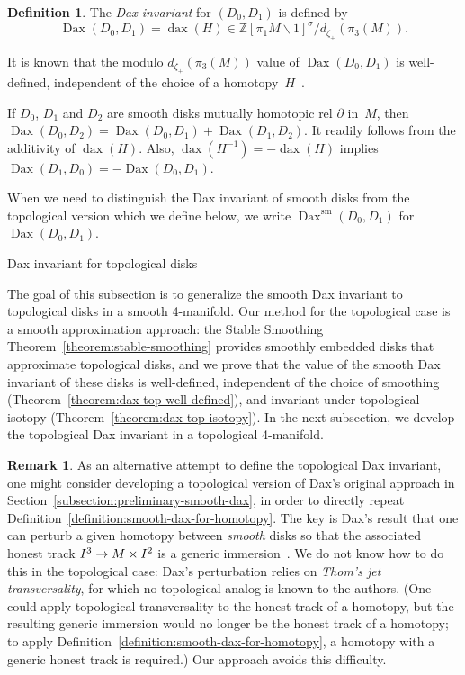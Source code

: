 \documentclass[11pt]{amsart}
\makeatletter
\def\subsection{\@startsection{subsection}{2}%
  \z@{-.8\linespacing\@plus-.3\linespacing}{.5\linespacing\@plus.2\linespacing}%
  {\normalfont\bfseries\large}}
\def\to{\mathchoice{\longrightarrow}{\rightarrow}{\rightarrow}{\rightarrow}}
\theoremstyle{definition}
\newtheorem{definition}[theorem]{Definition}
\newtheorem{remark}[theorem]{Remark}
\theoremstyle{theorem-giventitle}
\theoremstyle{definition-giventitle}
\numberwithin{equation}{section}
\def\Z{\mathbb{Z}}
\def\sm{\mathrm{sm}}
\def\dax{\operatorname{dax}}
\def\Dax{\operatorname{Dax}}
\def\setminus{\smallsetminus}
\makeatother
\begin{document}
\begin{definition}
  \label{definition:smooth-dax-disks}
  The \emph{Dax invariant} for $(D_0,D_1)$ is defined by
  \[
    \Dax(D_0,D_1) = \dax(H) \in \Z[\pi_1 M \setminus 1]^\sigma / d_{\zeta_+}(\pi_3(M)).
  \]
\end{definition}

It is known that the modulo $d_{\zeta_+}(\pi_3(M))$ value of $\Dax(D_0,D_1)$ is well-defined, independent of the choice of a homotopy~$H$~\cite{Gabai:2021-1,Kosanovic-Teichner:2024-2}.

If $D_0$, $D_1$ and $D_2$ are smooth disks mutually homotopic rel $\partial$ in~$M$,
then $\Dax(D_0,D_2) = \Dax(D_0,D_1) + \Dax(D_1,D_2)$.
It readily follows from the additivity of $\dax(H)$.
Also, $\dax(H^{-1}) = -\dax(H)$ implies $\Dax(D_1,D_0) = -\Dax(D_0,D_1)$.

When we need to distinguish the Dax invariant of smooth disks from the topological version which we define below, we write $\Dax^\sm(D_0,D_1)$ for $\Dax(D_0,D_1)$.


\subsection{Dax invariant for topological disks}
\label{subsection:dax-for-top-disks}

The goal of this subsection is to generalize the smooth Dax invariant to topological disks in a smooth 4-manifold.
Our method for the topological case is a smooth approximation approach:
the Stable Smoothing Theorem~\ref{theorem:stable-smoothing} provides smoothly embedded disks that approximate topological disks, and we prove that the value of the smooth Dax invariant of these disks is well-defined, independent of the choice of smoothing (Theorem~\ref{theorem:dax-top-well-defined}), and invariant under topological isotopy (Theorem~\ref{theorem:dax-top-isotopy}).
In the next subsection, we develop the topological Dax invariant in a topological 4-manifold.

\begin{remark}
  \label{remark:dax-why-smoothing-approach}
  As an alternative attempt to define the topological Dax invariant, one might consider developing a topological version of Dax's original approach in Section~\ref{subsection:preliminary-smooth-dax}, in order to directly repeat Definition~\ref{definition:smooth-dax-for-homotopy}.
  The key is Dax's result that one can perturb a given homotopy between \emph{smooth} disks so that the associated honest track $I^3\to M\times I^2$ is a generic immersion~\cite[Chapters III and~VI]{Dax:1972-1}\@.
  We do not know how to do this in the topological case:
  Dax's perturbation relies on \emph{Thom's jet transversality}, for which no topological analog is known to the authors.
  (One could apply topological transversality to the honest track of a homotopy, but the resulting generic immersion would no longer be the honest track of a homotopy;
  to apply Definition~\ref{definition:smooth-dax-for-homotopy}, a homotopy with a generic honest track is required.)
  Our approach avoids this difficulty.
\end{remark}
\end{document}
